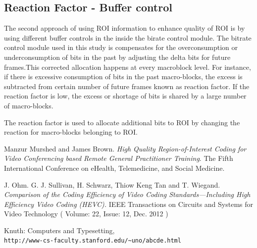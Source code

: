 \documentclass[11pt]{article} %
\begin{document}
\subsection{Reaction Factor - Buffer control} 
The second approach of using ROI information to enhance quality of ROI is by using different buffer controls in the inside the birate control module. The bitrate control module used in this study is compensates for the overconsumption or underconsumption of bits in the past by adjusting the delta bits for future frames.This corrected allocation happens at every macroblock level. For instance, if there is excessive consumption of bits in the past macro-blocks, the excess is subtracted from certain number of future frames known as reaction factor. If the reaction factor is low, the excess or shortage of bits is shared by a large number of macro-blocks.

The reaction factor is used to allocate additional bits to ROI by changing the reaction for macro-blocks belonging to ROI. 
%
%
%
%
%
\clearpage
\begin{thebibliography}{9}
Manzur Murshed and James Brown. 
\textit{High Quality Region-of-Interest Coding for Video Conferencing based Remote General Practitioner Training}. 
The Fifth International Conference on eHealth, Telemedicine, and Social Medicine.
 
J. Ohm. G. J. Sullivan, H. Schwarz, Thiow Keng Tan and T. Wiegand.
\textit{Comparison of the Coding Efficiency of Video Coding Standards—Including High Efficiency Video Coding (HEVC).}
 IEEE Transactions on Circuits and Systems for Video Technology ( Volume: 22, Issue: 12, Dec. 2012 )
 
Knuth: Computers and Typesetting,
\\\texttt{http://www-cs-faculty.stanford.edu/\~{}uno/abcde.html}
\end{thebibliography}
\end{document}
